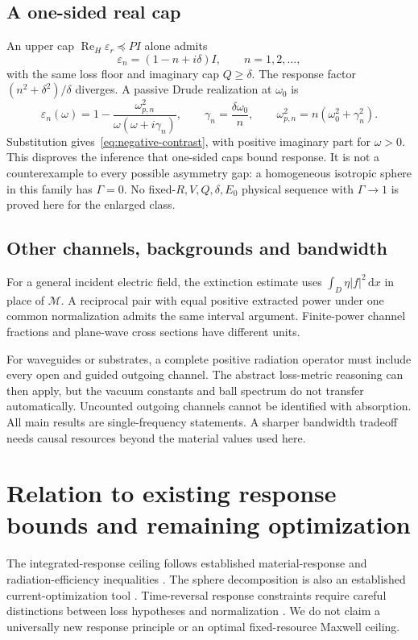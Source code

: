 \documentclass[11pt]{article}
\newcommand{\ReH}{\operatorname{Re}_{\!H}}
\newcommand{\dd}{\,\mathrm{d}}
\newcommand{\abs}[1]{\lvert #1\rvert}
\begin{document}
\subsection{A one-sided real cap}
An upper cap $\ReH\varepsilon_r\preceq PI$ alone admits
\begin{equation}\label{eq:negative-contrast}
 \varepsilon_n=(1-n+i\delta)I,\qquad n=1,2,\ldots,
\end{equation}
with the same loss floor and imaginary cap $Q\geq\delta$. The response factor $(n^2+\delta^2)/\delta$ diverges. A passive Drude realization at $\omega_0$ is
\[
 \varepsilon_n(\omega)=1-\frac{\omega_{p,n}^2}{\omega(\omega+i\gamma_n)},\qquad
 \gamma_n=\frac{\delta\omega_0}{n},\qquad
 \omega_{p,n}^2=n(\omega_0^2+\gamma_n^2).
\]
Substitution gives~\eqref{eq:negative-contrast}, with positive imaginary part for $\omega>0$. This disproves the inference that one-sided caps bound response. It is not a counterexample to every possible asymmetry gap: a homogeneous isotropic sphere in this family has $\Gamma=0$. No fixed-$R,V,Q,\delta,E_0$ physical sequence with $\Gamma\to1$ is proved here for the enlarged class.

\subsection{Other channels, backgrounds and bandwidth}
For a general incident electric field, the extinction estimate uses $\int_D\eta\abs f^2\dd x$ in place of $\mathcal M$. A reciprocal pair with equal positive extracted power under one common normalization admits the same interval argument. Finite-power channel fractions and plane-wave cross sections have different units.

For waveguides or substrates, a complete positive radiation operator must include every open and guided outgoing channel. The abstract loss-metric reasoning can then apply, but the vacuum constants and ball spectrum do not transfer automatically. Uncounted outgoing channels cannot be identified with absorption. All main results are single-frequency statements. A sharper bandwidth tradeoff needs causal resources beyond the material values used here.

\section{Relation to existing response bounds and remaining optimization}
The integrated-response ceiling follows established material-response and radiation-efficiency inequalities \citep{Miller2016,Schab2020,Gustafsson2020,Kuang2020}. The sphere decomposition is also an established current-optimization tool \citep{Gustafsson2024}. Time-reversal response constraints require careful distinctions between loss hypotheses and normalization \citep{SounasAlu2017,Ma2025}. We do not claim a universally new response principle or an optimal fixed-resource Maxwell ceiling.
\end{document}
